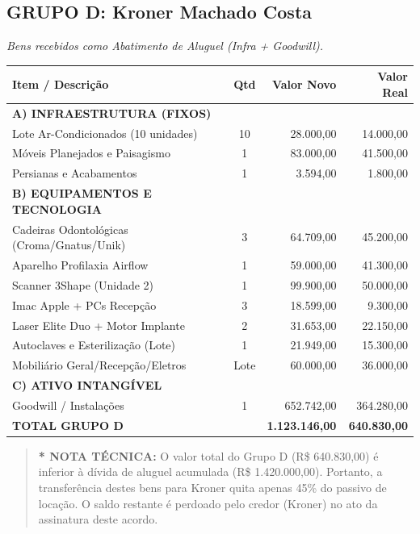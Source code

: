 \documentclass[12pt, a4paper]{article}
\newcommand{\reais}[1]{R\$ #1}
\begin{document}
\subsection*{GRUPO D: Kroner Machado Costa}
\textit{Bens recebidos como Abatimento de Aluguel (Infra + Goodwill).}

\begin{longtable}{>{\raggedright\arraybackslash}p{8cm} c r r}
    \toprule
    \rowcolor{tableHeader} \textbf{Item / Descrição} & \textbf{Qtd} & \textbf{Valor Novo} & \textbf{Valor Real} \\
    \midrule
    \endhead
    \rowcolors{2}{white}{gray!10}
    \textbf{A) INFRAESTRUTURA (FIXOS)} & & & \\
    Lote Ar-Condicionados (10 unidades) & 10 & 28.000,00 & 14.000,00 \\
    Móveis Planejados e Paisagismo & 1 & 83.000,00 & 41.500,00 \\
    Persianas e Acabamentos & 1 & 3.594,00 & 1.800,00 \\
    
    \textbf{B) EQUIPAMENTOS E TECNOLOGIA} & & & \\
    Cadeiras Odontológicas (Croma/Gnatus/Unik) & 3 & 64.709,00 & 45.200,00 \\
    Aparelho Profilaxia Airflow & 1 & 59.000,00 & 41.300,00 \\
    Scanner 3Shape (Unidade 2) & 1 & 99.900,00 & 50.000,00 \\
    Imac Apple + PCs Recepção & 3 & 18.599,00 & 9.300,00 \\
    Laser Elite Duo + Motor Implante & 2 & 31.653,00 & 22.150,00 \\
    Autoclaves e Esterilização (Lote) & 1 & 21.949,00 & 15.300,00 \\
    Mobiliário Geral/Recepção/Eletros & Lote & 60.000,00 & 36.000,00 \\
    
    \textbf{C) ATIVO INTANGÍVEL} & & & \\
    Goodwill / Instalações & 1 & 652.742,00 & 364.280,00 \\
    \midrule
    \rowcolor{lightGray} \textbf{TOTAL GRUPO D} & & \textbf{1.123.146,00} & \textbf{640.830,00} \\
    \bottomrule
\end{longtable}

\vspace{-0.3cm}
\begin{quote}
    \footnotesize \textbf{* NOTA TÉCNICA:} O valor total do Grupo D (\reais{640.830,00}) é inferior à dívida de aluguel acumulada (\reais{1.420.000,00}). Portanto, a transferência destes bens para Kroner quita apenas 45\% do passivo de locação. O saldo restante é perdoado pelo credor (Kroner) no ato da assinatura deste acordo.
\end{quote}
\newpage
\end{document}

